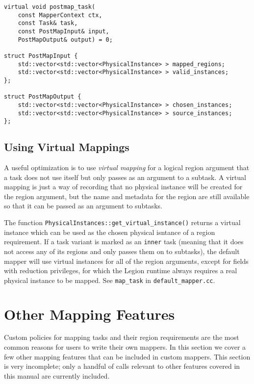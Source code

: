 \begin{lstlisting}
virtual void postmap_task(
    const MapperContext ctx,
    const Task& task,
    const PostMapInput& input,
    PostMapOutput& output) = 0;

struct PostMapInput {
    std::vector<std::vector<PhysicalInstance> > mapped_regions;
    std::vector<std::vector<PhysicalInstance> > valid_instances;
};

struct PostMapOutput {
    std::vector<std::vector<PhysicalInstance> > chosen_instances;
    std::vector<std::vector<PhysicalInstance> > source_instances;
};
\end{lstlisting}


\subsection{Using Virtual Mappings}
\label{subsec:mapping:virtual}
A useful optimization is to use {\em virtual mapping} for a logical region argument that a task does not use itself but only passes
as an argument to a subtask.  A virtual mapping is just a way of recording that no physical instance will be created for the region
argument, but the name and metadata for the region are still available so that it can be passed as an argument to subtasks.

The function {\tt PhysicalInstances::get\_virtual\_instance()} returns a virtual instance which can be used as the chosen physical
isntance of a region requirement.   If a task variant is marked as an {\tt inner} task (meaning that it does not access any of its regions and only passes them on to subtasks), the default mapper will use virtual instances for all of the region arguments, except for fields with reduction privileges, for which the Legion runtime always requires a real physical instance to be mapped.  See {\tt map\_task} in {\tt default\_mapper.cc}.



\section{Other Mapping Features}
\label{sec:mapping:others}

Custom policies for mapping tasks and their region requirements are the most common reasons for users to write their own mappers.
In this section we cover a few other mapping features that can be included in custom mappers.  This section is very incomplete; only
a handful of calls relevant to other features covered in this manual are currently included.
